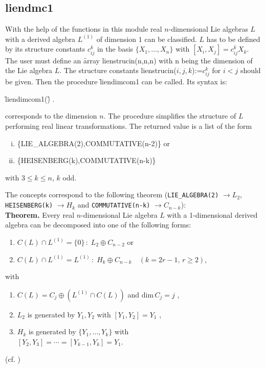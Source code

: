 

\subsection{liendmc1}

With the help of the functions in this module real $n$-dimensional Lie algebras
$L$ with a derived algebra $L^{(1)}$ of dimension $1$ can be classified. $L$ has
to be defined by its structure constants $c_{ij}^k$ in the basis
$\{X_1,\ldots,X_n\}$ with $[X_i,X_j]=c_{ij}^k X_k$. The user must define an
\f{array lienstrucin(n,n,n)} with n being the dimension of the Lie algebra $L$.
The structure constants lienstrucin($i,j,k$):=$c_{ij}^k$ for $i<j$ should be
given. Then the procedure \f{liendimcom1} can be called. Its syntax is:
\hypertarget{procedure:LIENDIMCOM1}{}
\begin{syntax}
   \f{liendimcom1(}\f{)} .
\end{syntax}
 corresponds to the dimension $n$. The procedure simplifies
the structure of $L$ performing real linear transformations. The returned
value is a list of the form
\begin{enumerate}[(i)]
  \item \{LIE\_ALGEBRA(2),COMMUTATIVE(n-2)\} or
  \item \{HEISENBERG(k),COMMUTATIVE(n-k)\}
\end{enumerate}
with $3\leq k\leq n$, $k$ odd.

The concepts correspond to the following theorem (\texttt{LIE\_ALGEBRA(2)}
$\rightarrow L_2$, \texttt{HEISENBERG(k)} $\rightarrow H_k$ and
\texttt{COMMUTATIVE(n-k)} $\rightarrow C_{n-k}$):\\[0.2cm]
\textbf{Theorem.} Every real $n$-dimensional Lie algebra $L$ with a 1-dimensional
derived algebra can be decomposed into one of the following forms:
\begin{enumerate}[(1)]
\item $C(L)\cap L^{(1)}=\{0\}\, :\; L_2\oplus C_{n-2}$
or
\item $C(L)\cap L^{(1)}=L^{(1)}\, :\; H_k\oplus C_{n-k}\quad
  (k=2r-1,\, r\geq 2)$,
\end{enumerate}
with
\pagebreak[2]
\begin{enumerate}[1.]
\item $C(L)=C_j\oplus (L^{(1)}\cap C(L))$
and dim$\,C_j=j$ ,
\item $L_2$ is generated by
$Y_1,Y_2$ with $[Y_1,Y_2]=Y_1$ ,
\item $H_k$ is generated by $\{Y_1,\ldots,Y_k\}$ with\\
 $[Y_2,Y_3]=\cdots =[Y_{k-1},Y_k]=Y_1$.
\end{enumerate}
(cf. \cite{Schoebel:93})

